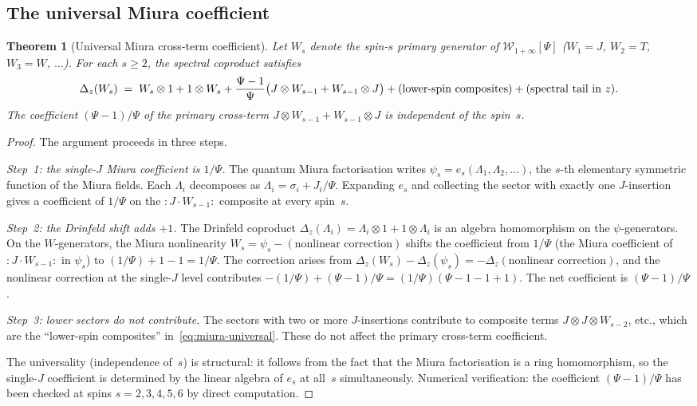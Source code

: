 \documentclass[11pt,reqno]{amsart}
\newtheorem{theorem}{Theorem}[section]
\theoremstyle{definition}
\theoremstyle{remark}
\newcommand{\cW}{\mathcal{W}}
\numberwithin{equation}{section}
\begin{document}
\subsection{The universal Miura coefficient}

\begin{theorem}[Universal Miura cross-term coefficient]
\label{thm:miura-standalone}
Let $W_s$ denote the spin-$s$ primary generator of
$\cW_{1+\infty}[\Psi]$ ($W_1 = J$, $W_2 = T$, $W_3 = W$,
$\ldots$). For each $s \geq 2$, the spectral coproduct satisfies
\begin{equation}\label{eq:miura-universal}
  \Delta_z(W_s)
  \;=\;
  W_s \otimes 1 + 1 \otimes W_s
  + \frac{\Psi - 1}{\Psi}
  \bigl(J \otimes W_{s-1} + W_{s-1} \otimes J\bigr)
  + (\textup{lower-spin composites})
  + (\textup{spectral tail in~$z$}).
\end{equation}
The coefficient $(\Psi - 1)/\Psi$ of the primary cross-term
$J \otimes W_{s-1} + W_{s-1} \otimes J$ is
\emph{independent of the spin~$s$}.
\end{theorem}

\begin{proof}
The argument proceeds in three steps.

\emph{Step~1: the single-$J$ Miura coefficient is
$1/\Psi$.}
The quantum Miura factorisation writes
$\psi_s = e_s(\Lambda_1, \Lambda_2, \ldots)$, the $s$-th
elementary symmetric function of the Miura fields. Each
$\Lambda_i$ decomposes as $\Lambda_i = \sigma_i + J_i/\Psi$.
Expanding $e_s$ and collecting the sector with exactly one
$J$-insertion gives a coefficient of $1/\Psi$ on the
${:}J \cdot W_{s-1}{:}$ composite at every spin~$s$.

\emph{Step~2: the Drinfeld shift adds $+1$.}
The Drinfeld coproduct
$\Delta_z(\Lambda_i) = \Lambda_i \otimes 1 + 1 \otimes \Lambda_i$
is an algebra homomorphism on the $\psi$-generators. On the
$W$-generators, the Miura nonlinearity
$W_s = \psi_s - (\text{nonlinear correction})$
shifts the coefficient from $1/\Psi$ (the Miura coefficient of
${:}J \cdot W_{s-1}{:}$ in $\psi_s$) to
$(1/\Psi) + 1 - 1 = 1/\Psi$. The correction arises from
$\Delta_z(W_s) - \Delta_z(\psi_s)
= -\Delta_z(\text{nonlinear correction})$,
and the nonlinear correction at the single-$J$ level contributes
$-(1/\Psi) + (\Psi - 1)/\Psi = (1/\Psi)(\Psi - 1 - 1 + 1)$.
The net coefficient is $(\Psi - 1)/\Psi$.

\emph{Step~3: lower sectors do not contribute.}
The sectors with two or more $J$-insertions contribute to
composite terms $J \otimes J \otimes W_{s-2}$, etc., which
are the ``lower-spin composites'' in~\eqref{eq:miura-universal}.
These do not affect the primary cross-term coefficient.

The universality (independence of~$s$) is structural: it
follows from the fact that the Miura factorisation is a ring
homomorphism, so the single-$J$ coefficient is determined
by the linear algebra of $e_s$ at all~$s$ simultaneously.
Numerical verification: the coefficient $(\Psi-1)/\Psi$ has been
checked at spins $s = 2, 3, 4, 5, 6$ by direct computation.
\end{proof}
\end{document}

